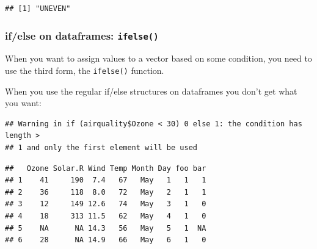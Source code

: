 \documentclass[]{book}
\newenvironment{Shaded}{\begin{snugshade}}{\end{snugshade}}
\newcommand{\CommentTok}[1]{\textcolor[rgb]{0.56,0.35,0.01}{\textit{#1}}}
\newcommand{\ControlFlowTok}[1]{\textcolor[rgb]{0.13,0.29,0.53}{\textbf{#1}}}
\newcommand{\DecValTok}[1]{\textcolor[rgb]{0.00,0.00,0.81}{#1}}
\newcommand{\KeywordTok}[1]{\textcolor[rgb]{0.13,0.29,0.53}{\textbf{#1}}}
\newcommand{\NormalTok}[1]{#1}
\newcommand{\OperatorTok}[1]{\textcolor[rgb]{0.81,0.36,0.00}{\textbf{#1}}}
\newcommand{\StringTok}[1]{\textcolor[rgb]{0.31,0.60,0.02}{#1}}
\begin{document}
\begin{verbatim}
## [1] "UNEVEN"
\end{verbatim}

\hypertarget{ifelse-on-dataframes-ifelse}{%
\subsubsection*{\texorpdfstring{if/else on dataframes: \texttt{ifelse()}}{if/else on dataframes: ifelse()}}\label{ifelse-on-dataframes-ifelse}}

When you want to assign values to a vector based on some condition, you need to use the third form, the \texttt{ifelse()} function.

When you use the regular if/else structures on dataframes you don't get what you want:

\begin{Shaded}
\end{Shaded}

\begin{verbatim}
## Warning in if (airquality$Ozone < 30) 0 else 1: the condition has length >
## 1 and only the first element will be used
\end{verbatim}

\begin{Shaded}
\end{Shaded}

\begin{verbatim}
##   Ozone Solar.R Wind Temp Month Day foo bar
## 1    41     190  7.4   67   May   1   1   1
## 2    36     118  8.0   72   May   2   1   1
## 3    12     149 12.6   74   May   3   1   0
## 4    18     313 11.5   62   May   4   1   0
## 5    NA      NA 14.3   56   May   5   1  NA
## 6    28      NA 14.9   66   May   6   1   0
\end{verbatim}
\end{document}
